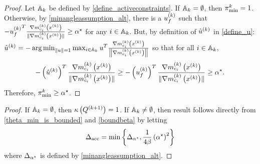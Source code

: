

\begin{proof}
Let ${\mathbb A_{k}}$ be defined by \cref{define_activeconstraints}.
If ${\mathbb A_{k}} = \emptyset$, then ${\pi^k_{\textrm{min}}} = 1$.
Otherwise, by \cref{minangleassumption_alt}, there is a ${u^{(k)}_f}$ such that 
$-{u^{(k)}_f}^T\frac{{\nabla m_{c_i}^{(k)}\left(x^{(k)}\right)}}{\|{\nabla m_{c_i}^{(k)}\left(x^{(k)}\right)}\|} \ge { \alpha^{\star} }$ for any $i \in {\mathbb A_{k}}$.
But, by definition of ${{\hat u}^{(k)}}$ in \cref{define_u}:
${{\hat u}^{(k)}} = -\operatorname*{arg\,min}_{\|u\| = 1} \max_{i \in {\mathbb A_{k}}} u^T\frac{{\nabla m_{c_i}^{(k)}\left(x^{(k)}\right)}}{\left\|{\nabla m_{c_i}^{(k)}\left(x^{(k)}\right)}\right\|}$
so that for all $i \in {\mathbb A_{k}}$,
\begin{align*}
-\left({{\hat u}^{(k)}}\right)^T\frac{{\nabla m_{c_i}^{(k)}\left(x^{(k)}\right)}}{\|{\nabla m_{c_i}^{(k)}\left(x^{(k)}\right)}\|}  \ge -\left({u^{(k)}_f}\right)^T\frac{{\nabla m_{c_i}^{(k)}\left(x^{(k)}\right)}}{\|{\nabla m_{c_i}^{(k)}\left(x^{(k)}\right)}\|} \ge { \alpha^{\star} }.
\end{align*}
Therefore, ${\pi^k_{\textrm{min}}} \ge { \alpha^{\star} }$.
\end{proof}

\begin{proof}
If ${\mathbb A_{k}} = \emptyset$, then 
${\kappa} \left({Q^{(k+1)}}\right) = 1$.
If ${\mathbb A_{k}} \ne \emptyset$, then result follows directly from \cref{theta_min_is_bounded} and \cref{boundbeta} by letting
\begin{align}
{\Delta_{\textrm{acc}}} = \min\left\{{\Delta_{\alpha^{\star}}}, \frac 1 {4 \beta} \left({ \alpha^{\star} } \right)^2 \right\} \label{define_delta_accuracy}
\end{align}
where ${\Delta_{\alpha^{\star}}}$ is defined by \cref{minangleassumption_alt}.
\end{proof}

